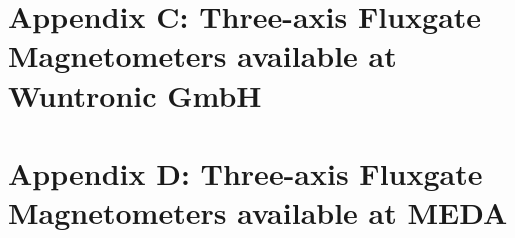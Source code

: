 \documentclass[a4paper,10pt]{report}
\begin{document}
\section*{Appendix C: Three-axis Fluxgate Magnetometers available at Wuntronic GmbH}
 
 
 
 
 
\section*{Appendix D: Three-axis Fluxgate Magnetometers available at MEDA}
 
 
\end{document}
